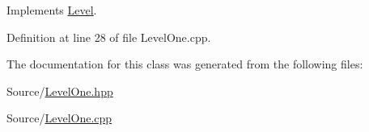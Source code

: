 Implements \hyperlink{class_level_a540d45e6d0ed7ce481d985881e8e27e2}{Level}.



Definition at line 28 of file Level\-One.\-cpp.



The documentation for this class was generated from the following files\-:\begin{DoxyCompactItemize}
\item 
Source/\hyperlink{_level_one_8hpp}{Level\-One.\-hpp}\item 
Source/\hyperlink{_level_one_8cpp}{Level\-One.\-cpp}\end{DoxyCompactItemize}
